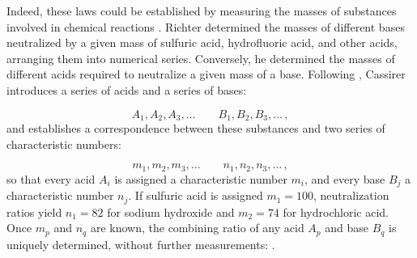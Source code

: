 \documentclass[submitted,12pt]{article}
\providecommand{\DIFaddbegin}{} %
\providecommand{\DIFaddend}{} %
\providecommand{\DIFdelbegin}{} %
\providecommand{\DIFdelend}{} %
\begin{document}
Indeed, these laws could be established by measuring the masses of substances involved in chemical reactions  . Richter determined the masses of different bases neutralized by a given mass of sulfuric acid, hydrofluoric acid, and other acids, arranging them into numerical series. Conversely, he determined the masses of different acids required to neutralize a given mass of a base. Following \citet[71]{Duhem1902}, Cassirer introduces a series of acids and a series of bases:

\begin{equation*}
A_1, A_2, A_3, \ldots \qquad B_1, B_2, B_3, \ldots\,,
\end{equation*}
%
and establishes a correspondence between these substances and two series of characteristic numbers:

\begin{equation*}
m_1, m_2, m_3, \ldots \qquad n_1, n_2, n_3, \ldots\,,
\end{equation*}
%
so that every acid $A_i$ is assigned a characteristic number $m_i$, and every base $B_j$ a characteristic number $n_j$. If sulfuric acid is assigned $m_1=100$, neutralization ratios yield $n_1=82$ for sodium hydroxide and $m_2=74$ for hydrochloric acid. Once $m_p$ and $n_q$ are known, the combining ratio of any acid $A_p$ and base $B_q$ is uniquely determined, without further measurements: \DIFdelbegin %
\DIFdelend \DIFaddbegin {} \DIFaddend {}.
\end{document}
